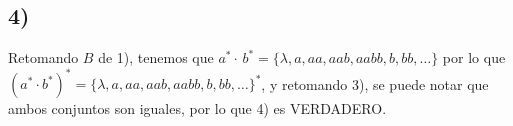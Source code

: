 \documentclass[stu, 12pt, letterpaper, donotrepeattitle, floatsintext, natbib]{apa7}
\begin{document}
\vspace{\baselineskip}
\subsection*{4)}
    Retomando \(B\) de 1), tenemos que \(a^{*}\cdot\, b^{*} = \{\lambda, a, aa, aab, aabb, b, bb, \dots\}\) 
    por lo que \(\left(a^{*}\cdot b^{*}\right)^{*} = \{\lambda, a, aa, aab, aabb, b, bb, \dots\}^{*}\), y 
    retomando 3), se puede notar que ambos conjuntos son iguales, por lo que 4) es VERDADERO.\par
\vspace{\baselineskip}
\end{document}
